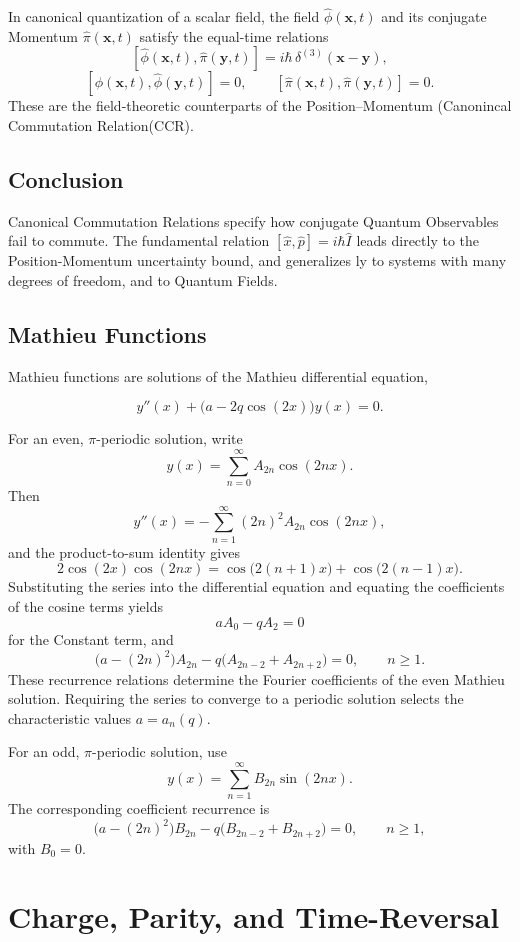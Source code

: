 \documentclass[a4paper, 10pt, onepage]{elegantbook}
\begin{document}
{In canonical quantization of a scalar field, the field
\(\hat{\phi}(\mathbf{x},t)\) and its conjugate Momentum
\(\hat{\pi}(\mathbf{x},t)\) satisfy the equal-time relations
\[
[\hat{\phi}(\mathbf{x},t),\hat{\pi}(\mathbf{y},t)]
=i\hbar\,\delta^{(3)}(\mathbf{x}-\mathbf{y}),
\]
\[
[\hat{\phi}(\mathbf{x},t),\hat{\phi}(\mathbf{y},t)]=0,
\qquad
[\hat{\pi}(\mathbf{x},t),\hat{\pi}(\mathbf{y},t)]=0.
\]
These are the field-theoretic counterparts of the Position--Momentum (Canonincal Commutation Relation(CCR).

\subsection{Conclusion}

Canonical Commutation Relations specify how conjugate Quantum Observables fail to commute. The fundamental relation
\([\hat{x},\hat{p}]=i\hbar\hat{I}\) leads directly to the Position-Momentum uncertainty bound, and generalizes 
ly to systems with many degrees of freedom, and to Quantum Fields.

\subsection{Mathieu Functions}

Mathieu functions are solutions of the Mathieu differential equation,

\[
y''(x) + \bigl(a - 2q\cos(2x)\bigr)y(x) = 0.
\]

For an even, \(\pi\)-periodic solution, write
\[
y(x) = \sum_{n=0}^{\infty} A_{2n}\cos(2nx).
\]
Then
\[
y''(x) = -\sum_{n=1}^{\infty}(2n)^2A_{2n}\cos(2nx),
\]
and the product-to-sum identity gives
\[
2\cos(2x)\cos(2nx)
= \cos\bigl(2(n+1)x\bigr)+\cos\bigl(2(n-1)x\bigr).
\]
Substituting the series into the differential equation and equating
the coefficients of the cosine terms yields
\[
aA_0-qA_2=0
\]
for the Constant term, and
\[
\bigl(a-(2n)^2\bigr)A_{2n}
-q\bigl(A_{2n-2}+A_{2n+2}\bigr)=0,
\qquad n\geq 1.
\]
These recurrence relations determine the Fourier coefficients of the
even Mathieu solution. Requiring the series to converge to a periodic
solution selects the characteristic values \(a=a_n(q)\).

For an odd, \(\pi\)-periodic solution, use
\[
y(x)=\sum_{n=1}^{\infty}B_{2n}\sin(2nx).
\]
The corresponding coefficient recurrence is
\[
\bigl(a-(2n)^2\bigr)B_{2n}
-q\bigl(B_{2n-2}+B_{2n+2}\bigr)=0,
\qquad n\geq 1,
\]
with \(B_0=0\).


\section{Charge, Parity, and Time-Reversal}

}
\end{document}

